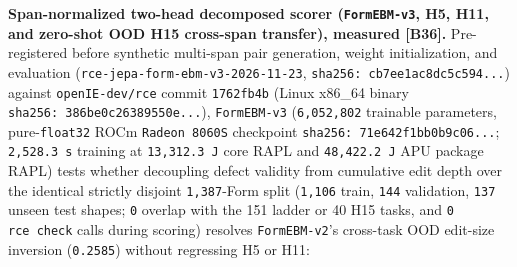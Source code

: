 \documentclass[10pt,letterpaper]{article}
\begin{document}
\textbf{Span-normalized two-head decomposed scorer (\texttt{FormEBM-\allowbreak{}v3},
H5, H11, and zero-shot OOD H15 cross-span transfer), measured
{[}B36{]}.} Pre-registered before synthetic multi-span pair generation,
weight initialization, and evaluation
(\texttt{rce-\allowbreak{}jepa-\allowbreak{}form-\allowbreak{}ebm-\allowbreak{}v3-\allowbreak{}2026-\allowbreak{}11-\allowbreak{}23},
\texttt{sha256:\ cb7ee1ac\allowbreak{}8dc5c594.\allowbreak{}.\allowbreak{}.\allowbreak{}}) against \texttt{openIE-\allowbreak{}dev/\allowbreak{}rce}
commit \texttt{1762fb4b} (Linux x86\_64 binary
\texttt{sha256:\ 386be0c2\allowbreak{}6389550e.\allowbreak{}.\allowbreak{}.\allowbreak{}}), \texttt{FormEBM-\allowbreak{}v3}
(\texttt{6,052,802} trainable parameters, pure-\texttt{float32} ROCm
\texttt{Radeon\ 8060S} checkpoint \texttt{sha256:\ 71e642f1\allowbreak{}bb0b9c06.\allowbreak{}.\allowbreak{}.\allowbreak{}};
\texttt{2,\allowbreak{}528.\allowbreak{}3\ s} training at \texttt{13,\allowbreak{}312.\allowbreak{}3\ J} core RAPL and
\texttt{48,\allowbreak{}422.\allowbreak{}2\ J} APU package RAPL) tests whether decoupling defect
validity from cumulative edit depth over the identical strictly disjoint
\texttt{1,387}-Form split (\texttt{1,106} train, \texttt{144}
validation, \texttt{137} unseen test shapes; \texttt{0} overlap with the
151 ladder or 40 H15 tasks, and \texttt{0} \texttt{rce\ check} calls
during scoring) resolves \texttt{FormEBM-\allowbreak{}v2}'s cross-task OOD edit-size
inversion (\texttt{0.2585}) without regressing H5 or H11:
\end{document}
